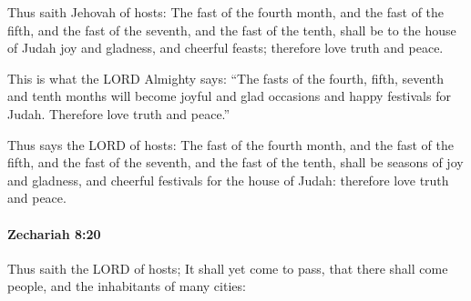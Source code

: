 			\begin{versebox}
					\item[BHS] 
					\item[LXX] 
					\item[ASV] Thus saith Jehovah of hosts: The fast of the fourth month, and the fast of the fifth, and the fast of the seventh, and the fast of the tenth, shall be to the house of Judah joy and gladness, and cheerful feasts; therefore love truth and peace.
					\item[NIV] This is what the LORD Almighty says: “The fasts of the fourth, fifth, seventh and tenth months will become joyful and glad occasions and happy festivals for Judah. Therefore love truth and peace.”
					\item[NRSV] Thus says the LORD of hosts: The fast of the fourth month, and the fast of the fifth, and the fast of the seventh, and the fast of the tenth, shall be seasons of joy and gladness, and cheerful festivals for the house of Judah: therefore love truth and peace.
			\end{versebox}

		\paragraph{Zechariah 8:20} %
			\label{ZECHARIAH-8-20}

			Thus saith the LORD of hosts; It shall yet come to pass, that there shall come people, and the inhabitants of many cities:

